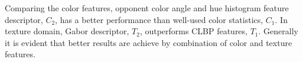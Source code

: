 Comparing the color features, opponent color angle and hue histogram feature descriptor, $C_{2}$, has a better performance than well-used color statistics, $C_{1}$. 
In texture domain, Gabor descriptor, $T_{2}$, outperforms CLBP features, $T_{1}$.
Generally it is evident that better results are achieve by combination of color and texture features. 



